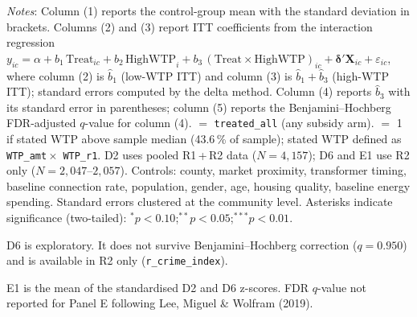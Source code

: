 \begin{table}[htbp]
\begin{threeparttable}
\begin{tablenotes}[flushleft]
\footnotesize
\setlength{\itemsep}{2pt}
\item \textit{Notes}: Column (1) reports the control-group mean with the
  standard deviation in brackets. Columns (2) and (3) report ITT
  coefficients from the interaction regression
  $y_{ic} = \alpha + b_1\,\text{Treat}_{ic} + b_2\,\text{HighWTP}_{i}
  + b_3\,(\text{Treat}\times\text{HighWTP})_{ic} + \boldsymbol{\delta}'\mathbf{X}_{ic}
  + \varepsilon_{ic}$,
  where column (2) is $\hat{b}_1$ (low-WTP ITT) and column (3) is
  $\hat{b}_1 + \hat{b}_3$ (high-WTP ITT); standard errors computed by
  the delta method. Column (4) reports $\hat{b}_3$ with its standard
  error in parentheses; column (5) reports the Benjamini--Hochberg
  FDR-adjusted $q$-value for column (4).
   $=$ \texttt{treated\_all} (any subsidy arm).
   $=$ 1 if stated WTP above sample median (43.6\,\%
  of sample); stated WTP defined as \texttt{WTP\_amt}\,$\times$\,
  \texttt{WTP\_r1}. D2 uses pooled R1\,+\,R2 data ($N = 4{,}157$);
  D6 and E1 use R2 only ($N = 2{,}047$--$2{,}057$).
  Controls: county, market proximity, transformer timing, baseline
  connection rate, population, gender, age, housing quality, baseline
  energy spending. Standard errors clustered at the community level.
  Asterisks indicate significance (two-tailed):
  $^{*}p<0.10$;\;$^{**}p<0.05$;\;$^{***}p<0.01$.
\item[$\dagger$] D6 is exploratory. It does not survive
  Benjamini--Hochberg correction ($q = 0.950$) and is available in
  R2 only (\texttt{r\_crime\_index}).
\item[$\ddagger$] E1 is the mean of the standardised D2 and D6
  z-scores. FDR $q$-value not reported for Panel E following
  Lee, Miguel \& Wolfram (2019).
\end{tablenotes}
\end{threeparttable}
\end{table}
